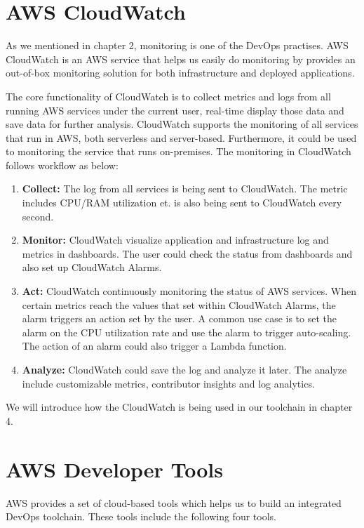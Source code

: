 \section{AWS CloudWatch}
As we mentioned in chapter 2, monitoring is one of the DevOps practises. AWS CloudWatch is an AWS service that helps us easily do monitoring by provides an out-of-box monitoring solution for both infrastructure and deployed applications. 
\par
The core functionality of CloudWatch is to collect metrics and logs from all running AWS services under the current user, real-time display those data and save data for further analysis.
CloudWatch supports the monitoring of all services that run in AWS, both serverless and server-based. Furthermore, it could be used to monitoring the service that runs on-premises. The monitoring in CloudWatch follows workflow as below:
\begin{enumerate}
    \item \textbf{Collect:} The log from all services is being sent to CloudWatch. The metric includes CPU/RAM utilization et. is also being sent to CloudWatch every second.
    \item \textbf{Monitor:} CloudWatch visualize application and infrastructure log and metrics in dashboards. The user could check the status from dashboards and also set up CloudWatch Alarms.
    \item \textbf{Act:} CloudWatch continuously monitoring the status of AWS services. 
    When certain metrics reach the values that set within CloudWatch Alarms, the alarm triggers an action set by the user. A common use case is to set the alarm on the CPU utilization rate and use the alarm to trigger auto-scaling. The action of an alarm could also trigger a Lambda function.
    \item \textbf{Analyze:} CloudWatch could save the log and analyze it later. The analyze include customizable metrics, contributor insights and log analytics.
\end{enumerate}
We will introduce how the CloudWatch is being used in our toolchain in chapter 4.
\section{AWS Developer Tools}
AWS provides a set of cloud-based tools which helps us to build an integrated DevOps toolchain. These tools include the following four tools.
